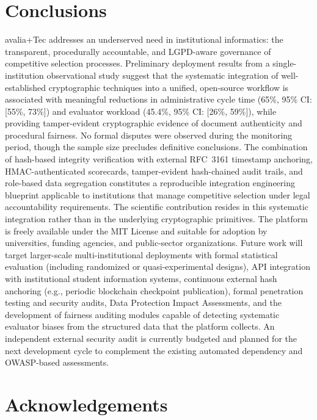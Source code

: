 \documentclass[preprint,12pt,a4paper]{elsarticle}
\begin{document}
\section{Conclusions}

avalia+Tec addresses an underserved need in institutional informatics: the transparent, procedurally accountable, and LGPD-aware governance of competitive selection processes. Preliminary deployment results from a single-institution observational study suggest that the systematic integration of well-established cryptographic techniques into a unified, open-source workflow is associated with meaningful reductions in administrative cycle time (65\%, 95\% CI: [55\%, 73\%]) and evaluator workload (45.4\%, 95\% CI: [26\%, 59\%]), while providing tamper-evident cryptographic evidence of document authenticity and procedural fairness. No formal disputes were observed during the monitoring period, though the sample size precludes definitive conclusions. The combination of hash-based integrity verification with external RFC~3161 timestamp anchoring, HMAC-authenticated scorecards, tamper-evident hash-chained audit trails, and role-based data segregation constitutes a reproducible integration engineering blueprint applicable to institutions that manage competitive selection under legal accountability requirements. The scientific contribution resides in this systematic integration rather than in the underlying cryptographic primitives. The platform is freely available under the MIT License and suitable for adoption by universities, funding agencies, and public-sector organizations. Future work will target larger-scale multi-institutional deployments with formal statistical evaluation (including randomized or quasi-experimental designs), API integration with institutional student information systems, continuous external hash anchoring (e.g., periodic blockchain checkpoint publication), formal penetration testing and security audits, Data Protection Impact Assessments, and the development of fairness auditing modules capable of detecting systematic evaluator biases from the structured data that the platform collects. An independent external security audit is currently budgeted and planned for the next development cycle to complement the existing automated dependency and OWASP-based assessments.

\section*{Acknowledgements}
\end{document}
